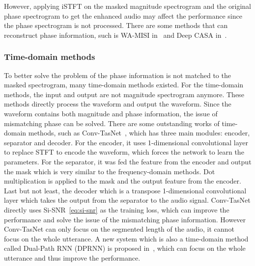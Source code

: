 However, applying iSTFT on the masked magnitude spectrogram and the original phase spectrogram to get the enhanced audio may affect the performance since the phase spectrogram is not processed.
There are some methods that can reconstruct phase information, such is WA-MISI in~\cite{WA-MISI} and Deep CASA in~\cite{Deep_CASA}.

\subsubsection{Time-domain methods}

To better solve the problem of the phase information is not matched to the masked spectrogram, many time-domain methods existed.
For the time-domain methods, the input and output are not magnitude spectrogram anymore.
These methods directly process the waveform and output the waveform.
Since the waveform contains both magnitude and phase information, the issue of mismatching phase can be solved.
There are some outstanding works of time-domain methods, such as Conv-TasNet~\cite{conv_tasnet}, which has three main modules: encoder, separator and decoder.
For the encoder, it uses 1-dimensional convolutional layer to replace STFT to encode the waveform, which forces the network to learn the parameters.
For the separator, it was fed the feature from the encoder and output the mask which is very similar to the frequency-domain methods.
Dot multiplication is applied to the mask and the output feature from the encoder.
Last but not least, the decoder which is a transpose 1-dimensional convolutional layer which takes the output from the separator to the audio signal.
Conv-TasNet directly uses Si-SNR~\ref{eq:si-snr} as the training loss, which can improve the performance and solve the issue of the mismatching phase information.
However Conv-TasNet can only focus on the segmented length of the audio, it cannot focus on the whole utterance.
A new system which is also a time-domain method called Dual-Path RNN (DPRNN) is proposed in~\cite{dprnn}, which can focus on the whole utterance and thus improve the performance.
